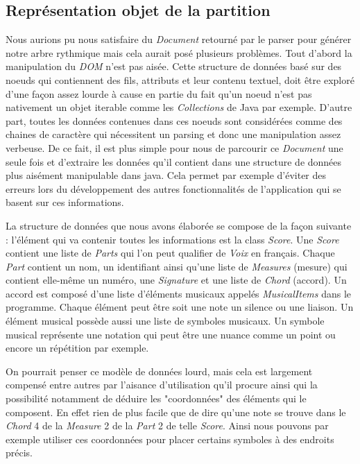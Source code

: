 \subsection{Représentation objet de la partition}
\par
Nous aurions pu nous satisfaire du \emph{Document} retourné par le parser pour
générer notre arbre rythmique mais cela aurait posé plusieurs problèmes. Tout d'abord
la manipulation du \emph{DOM} n'est pas aisée. Cette structure de données basé sur
des noeuds qui contiennent des fils, attributs et leur contenu textuel, doit
être exploré d'une façon assez lourde à cause en partie du fait qu'un noeud n'est
pas nativement un objet iterable comme les \emph{Collections} de Java par exemple.
D'autre part, toutes les données contenues dans ces noeuds sont considérées comme des chaines
de caractère qui nécessitent un parsing et donc une manipulation assez verbeuse.
De ce fait, il est plus simple pour nous de parcourir ce \emph{Document} une seule fois et d'extraire les données qu'il
contient dans une structure de données plus aisément manipulable dans java. Cela
permet par exemple d'éviter des erreurs lors du développement des autres fonctionnalités de
l'application qui se basent sur ces informations.

\par
La structure de données que nous avons élaborée se compose de la façon suivante :
l'élément qui va contenir toutes les informations est la class \emph{Score}. Une
\emph{Score} contient une liste de \emph{Parts} qui l'on peut qualifier de
\emph{Voix} en français. Chaque \emph{Part} contient un nom, un identifiant ainsi qu'une liste
de \emph{Measures} (mesure) qui contient elle-même un numéro, une \emph{Signature} et une
liste de \emph{Chord} (accord). Un accord est composé d'une liste d'éléments musicaux
appelés \emph{MusicalItems} dans le programme. Chaque élément peut être soit une note
un silence ou une liaison. Un élément musical possède aussi une liste de symboles
musicaux. Un symbole musical représente une notation qui peut être une nuance comme
un point ou encore un répétition par exemple.
\par
On pourrait penser ce modèle de données lourd, mais cela est largement compensé entre autres
par l'aisance d'utilisation qu'il procure ainsi qui la possibilité notamment de déduire les
"coordonnées" des éléments qui le composent. En effet rien de plus facile que de dire
qu'une note se trouve dans le \emph{Chord} 4 de la \emph{Measure} 2 de la \emph{Part}
2 de telle \emph{Score}. Ainsi nous pouvons par exemple utiliser ces coordonnées pour
placer certains symboles à des endroits précis.
